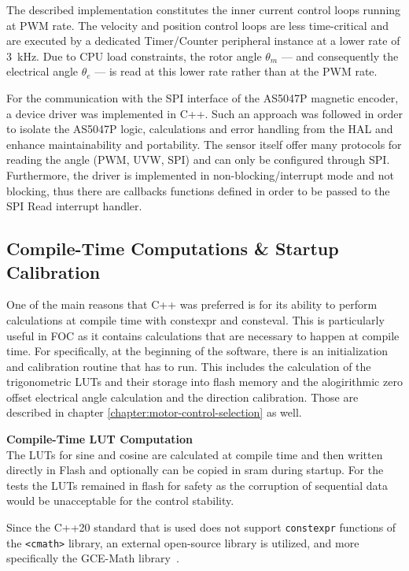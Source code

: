 The described implementation constitutes the inner current control loops running at PWM rate. The velocity and position control loops are less time-critical and are executed by a dedicated Timer/Counter peripheral instance at a lower rate of \SI{3}{\kilo\hertz}. Due to CPU load constraints, the rotor angle $\theta_m$ --- and consequently the electrical angle $\theta_e$ --- is read at this lower rate rather than at the PWM rate.

For the communication with the SPI interface of the AS5047P magnetic encoder, a device driver was implemented in C++. Such an approach was followed in order to isolate the AS5047P logic, calculations and error handling from the HAL and enhance maintainability and portability. The sensor itself offer many protocols for reading the angle (PWM, UVW, SPI) and can only be configured through SPI. Furthermore, the driver is implemented in non-blocking/interrupt mode and not blocking, thus there are callbacks functions defined in order to be passed to the SPI Read interrupt handler.

\subsection{Compile-Time Computations \& Startup Calibration}

One of the main reasons that C++ was preferred is for its ability to perform calculations at compile time with constexpr and consteval. This is particularly useful in FOC as it contains calculations that are necessary to happen at compile time. For specifically, at the beginning of the software, there is an initialization and calibration routine that has to run. This includes the calculation of the trigonometric LUTs and their storage into flash memory and the alogirithmic zero offset electrical angle calculation and the direction calibration. Those are described in chapter \ref{chapter:motor-control-selection} as well.

\textbf{Compile-Time LUT Computation} \\
The LUTs for sine and cosine are calculated at compile time and then written directly in Flash and optionally can be copied in sram during startup. For the tests the LUTs remained in flash for safety as the corruption of sequential data would be unacceptable for the control stability.

Since the C++20 standard that is used does not support \texttt{constexpr} functions of the \texttt{<cmath>} library, an external open-source library is utilized, and more specifically the GCE-Math library~\cite{ohara_gcem}.

